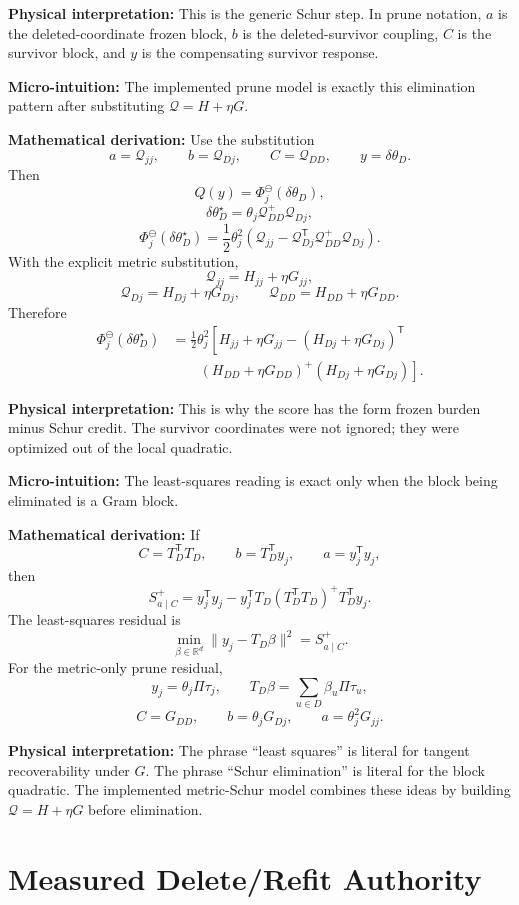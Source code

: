 \documentclass[10pt,twocolumn]{article}
\newcommand{\blocktitle}[1]{\vspace{2pt}\noindent\textbf{#1}\space}
\newcommand{\micro}[1]{\blocktitle{Micro-intuition:} #1}
\newcommand{\deriv}{\blocktitle{Mathematical derivation:}}
\newcommand{\phys}[1]{\blocktitle{Physical interpretation:} #1}
\begin{document}
\phys{This is the generic Schur step. In prune notation, \(a\) is the deleted-coordinate frozen block, \(b\) is the deleted-survivor coupling, \(C\) is the survivor block, and \(y\) is the compensating survivor response.}

\micro{The implemented prune model is exactly this elimination pattern after substituting \(\mathcal Q=H+\eta G\).}

\deriv
Use the substitution
\[
a=\mathcal Q_{jj},
\qquad
b=\mathcal Q_{Dj},
\qquad
C=\mathcal Q_{DD},
\qquad
y=\delta\theta_D .
\]
Then
\[
Q(y)=\Phi_j^\ominus(\delta\theta_D),
\]
\[
\delta\theta_D^\star
=
\theta_j\mathcal Q_{DD}^+\mathcal Q_{Dj},
\]
\[
\Phi_j^\ominus(\delta\theta_D^\star)
=
\frac12\theta_j^2
\left(
\mathcal Q_{jj}
-
\mathcal Q_{Dj}^{\mathsf T}\mathcal Q_{DD}^+\mathcal Q_{Dj}
\right).
\]
With the explicit metric substitution,
\[
\mathcal Q_{jj}=H_{jj}+\eta G_{jj},
\]
\[
\mathcal Q_{Dj}=H_{Dj}+\eta G_{Dj},
\qquad
\mathcal Q_{DD}=H_{DD}+\eta G_{DD}.
\]
Therefore
{\small
\[
\begin{aligned}
\Phi_j^\ominus(\delta\theta_D^\star)
&=
\frac12\theta_j^2
\left[
H_{jj}+\eta G_{jj}
-
(H_{Dj}+\eta G_{Dj})^{\mathsf T}
 \right.
\\
&\qquad\left.
(H_{DD}+\eta G_{DD})^+
(H_{Dj}+\eta G_{Dj})
\right].
\end{aligned}
\]
}

\phys{This is why the score has the form frozen burden minus Schur credit. The survivor coordinates were not ignored; they were optimized out of the local quadratic.}

\micro{The least-squares reading is exact only when the block being eliminated is a Gram block.}

\deriv
If
\[
C=T_D^{\mathsf T}T_D,
\qquad
b=T_D^{\mathsf T}y_j,
\qquad
a=y_j^{\mathsf T}y_j,
\]
then
\[
S_{a\mid C}^+
=
y_j^{\mathsf T}y_j
-
y_j^{\mathsf T}T_D
(T_D^{\mathsf T}T_D)^+
T_D^{\mathsf T}y_j.
\]
The least-squares residual is
\[
\min_{\beta\in\mathbb R^d}
\|y_j-T_D\beta\|^2
=
S_{a\mid C}^+.
\]
For the metric-only prune residual,
\[
y_j=\theta_j\Pi\tau_j,
\qquad
T_D\beta=\sum_{u\in D}\beta_u\Pi\tau_u,
\]
\[
C=G_{DD},
\qquad
b=\theta_jG_{Dj},
\qquad
a=\theta_j^2G_{jj}.
\]

\phys{The phrase ``least squares'' is literal for tangent recoverability under \(G\). The phrase ``Schur elimination'' is literal for the block quadratic. The implemented metric-Schur model combines these ideas by building \(\mathcal Q=H+\eta G\) before elimination.}

\section*{Measured Delete/Refit Authority}
\end{document}
